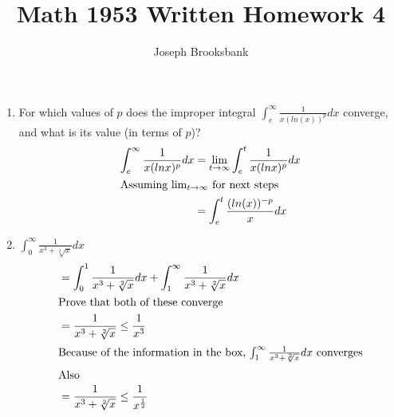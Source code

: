 \documentclass[]{report}
\title{Math 1953 Written Homework 4}
\author{Joseph Brooksbank}
\begin{document}
\maketitle


\noindent{}
\begin{enumerate}
        \item For which values of $p$ does the improper integral $\int_{e}^{\infty} \frac{1}{x(ln(x))^{p}} dx $ converge, and what is its value (in terms of $p$)?
                                \begin{align}
                                        \int_{e}^{\infty} \frac{1}{x(lnx)^p} dx 
                                        &= \lim_{t\to\infty} \int_{e}^{t} \frac{1}{x(lnx)^{p}} dx \\
                                        \shortintertext{Assuming $\lim_{t\to\infty}  $ for next steps} 
                                        &= \int_{e}^{t} \frac{(ln(x))^{-p}}{x} dx \\
                                \end{align}

        \item   $\int_{0}^{\infty} \frac{1}{x^{3} + \sqrt[2]{x} } dx $
                \begin{align}
                        &= \int_{0}^{1} \frac{1}{x^{3} + \sqrt[2]{x} } dx + \int_{1}^{\infty} \frac{1}{x^{3}+\sqrt[2]{x} } dx \\
                        \shortintertext{Prove that both of these converge } 
                        &= \frac{1}{x^{3}+\sqrt[2]{x} } \leq \frac{1}{x^{3}}\\
                        \shortintertext{Because of the information in the box, $\int_{1}^{\infty} \frac{1}{x^{3}+\sqrt[2]{x} } dx $ converges} 
                        \shortintertext{Also} 
                        &= \frac{1}{x^{3}+\sqrt[2]{x} } \leq \frac{1}{x^{\frac{1}{2}}}
                \end{align}
\end{enumerate}
\end{document}
